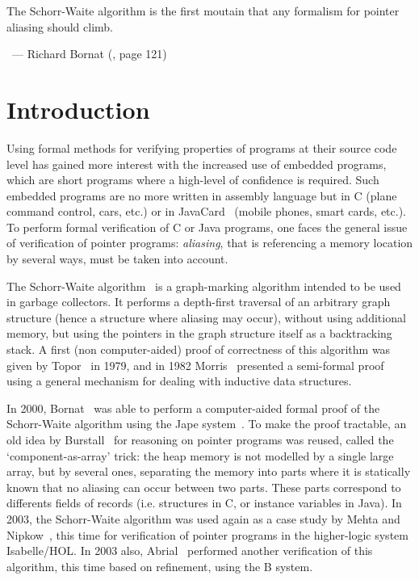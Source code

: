 


\hfill\begin{minipage}{0.6\textwidth}
\begin{slshape}
The Schorr-Waite algorithm is the first moutain that any formalism for
pointer aliasing should climb.
\end{slshape}

~\hfill --- Richard Bornat (\cite{bornat00mpc}, page 121)
\end{minipage}

\section{Introduction}

Using formal methods for verifying properties of programs at their
source code level has gained more interest with the increased use of
embedded programs, which are short programs where a high-level of
confidence is required. Such embedded programs are no more written in
assembly language but in C (plane command control, cars, etc.) or in
JavaCard~\cite{JavaCard} (mobile phones, smart cards, etc.).  To
perform formal verification of C or Java programs, one faces the
general issue of verification of pointer programs: \emph{aliasing},
that is referencing a memory location by several ways, must be taken
into account. 

The Schorr-Waite algorithm~\cite{schorr67cacm} is a graph-marking
algorithm intended to be used in garbage collectors. It performs a
depth-first traversal of an arbitrary graph structure (hence a
structure where aliasing may occur), without using additional memory,
but using the pointers in the graph structure itself as a backtracking
stack. A first (non computer-aided) proof of correctness of this
algorithm was given by Topor~\cite{topor79acta} in 1979, and in 1982
Morris~\cite{morris82} presented a semi-formal proof using a general
mechanism for dealing with inductive data structures.


In 2000, Bornat~\cite{bornat00mpc} was able to perform a
computer-aided formal proof of the Schorr-Waite algorithm using the
Jape system~\cite{bornat99}. To make the proof tractable, an old idea by
Burstall~\cite{burstall72} for reasoning on pointer programs was
reused, called the `component-as-array' trick: the heap
memory is not modelled by a single large array, but by several ones,
separating the memory into parts where it is statically known that no
aliasing can occur between two parts. These parts correspond to
differents fields of records (i.e. structures in C, or instance
variables in Java).
In 2003, the Schorr-Waite algorithm was used again as a case
study by Mehta and Nipkow~\cite{mehta03cade}, this time for
verification of pointer programs in the higher-logic system
Isabelle/HOL. In 2003 also, Abrial~\cite{abrial03fme} performed another
verification of this algorithm, this time based on refinement, using
the B system.

